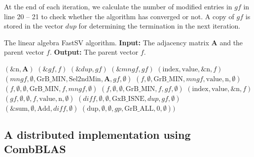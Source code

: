 \documentclass{sokendai_thesis} %
\begin{document}
At the end of each iteration, we calculate the number of modified entries in $\mathit{gf}$ in line 20 -- 21 to check whether the algorithm has converged or not.
A copy of $\mathit{gf}$ is stored in the vector $\mathit{dup}$ for determining the termination in the next iteration.

\begin{algorithm}[t]
\small
\caption{The linear algebra FastSV algorithm. \textbf{Input:} The adjacency matrix $\mathbf{A}$ and the parent vector $f$. \textbf{Output:} The parent vector $f$.}
\label{algo:graphblas2}
\begin{algorithmic}[1]
\State {} $(\&\text{n}, \mathbf{A})$
\State {} $(\&\mathit{gf}, \mathit{f})$ 
\State {} $(\&\mathit{dup}, \mathit{gf})$ 
\State {} $(\&\mathit{mngf}, \mathit{gf})$
\State {} $(\text{index}, \text{value}, \&\text{n}, f)$
\Repeat
  \State {}
  \State {} $(\mathit{mngf}, \emptyset, \text{GrB\_MIN}, \text{Sel2ndMin}, \mathbf{A}, \mathit{gf}, \emptyset)$
  \State {} $(f, \emptyset, \text{GrB\_MIN}, \mathit{mngf}, \text{value}, \text{n}, \emptyset)$
  \State {}
  \State {} $(f, \emptyset, \emptyset, \text{GrB\_MIN}, f, \mathit{mngf}, \emptyset)$
  \State {}
  \State {} $(f, \emptyset, \emptyset, \text{GrB\_MIN}, f, \mathit{gf}, \emptyset)$
  \State {}
  \State {} $(\text{index}, \text{value}, \&\text{n}, f)$
  \State {} $(\mathit{gf}, \emptyset, \emptyset, f, \text{value}, \text{n}, \emptyset)$
  \State {}
  \State {} $(\mathit{diff}, \emptyset, \emptyset, \text{GxB\_ISNE}, \mathit{dup}, \mathit{gf}, \emptyset)$
  \State {} $(\&\text{sum}, \emptyset, \text{Add}, \mathit{diff}, \emptyset)$
    \State {} $(\text{dup}, \emptyset, \emptyset, \mathit{gp}, \text{GrB\_ALL}, 0, \emptyset))$
\EndProcedure
\end{algorithmic}
\end{algorithm}

\subsection{A distributed implementation using CombBLAS}
\label{sec:sv-combblas}
\end{document}
